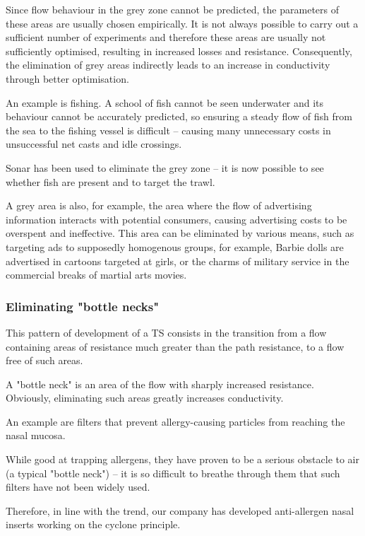 \documentclass[a4paper,11pt]{article}
\begin{document}
Since flow behaviour in the grey zone cannot be predicted, the parameters of
these areas are usually chosen empirically. It is not always possible to carry
out a sufficient number of experiments and therefore these areas are usually
not sufficiently optimised, resulting in increased losses and resistance.
Consequently, the elimination of grey areas indirectly leads to an increase in
conductivity through better optimisation.

An example is fishing. A school of fish cannot be seen underwater and its
behaviour cannot be accurately predicted, so ensuring a steady flow of fish
from the sea to the fishing vessel is difficult -- causing many unnecessary
costs in unsuccessful net casts and idle crossings.

Sonar has been used to eliminate the grey zone -- it is now possible to see
whether fish are present and to target the trawl.

A grey area is also, for example, the area where the flow of advertising
information interacts with potential consumers, causing advertising costs to
be overspent and ineffective. This area can be eliminated by various means,
such as targeting ads to supposedly homogenous groups, for example, Barbie
dolls are advertised in cartoons targeted at girls, or the charms of military
service in the commercial breaks of martial arts movies.

\subsubsection{Eliminating "bottle necks"}

This pattern of development of a TS consists in the transition from a flow
containing areas of resistance much greater than the path resistance, to a
flow free of such areas.

A "bottle neck" is an area of the flow with sharply increased resistance.
Obviously, eliminating such areas greatly increases conductivity.

An example are filters that prevent allergy-causing particles from reaching
the nasal mucosa.

While good at trapping allergens, they have proven to be a serious obstacle to
air (a typical "bottle neck") -- it is so difficult to breathe through them
that such filters have not been widely used.

Therefore, in line with the trend, our company has developed anti-allergen
nasal inserts working on the cyclone principle.
\end{document}
